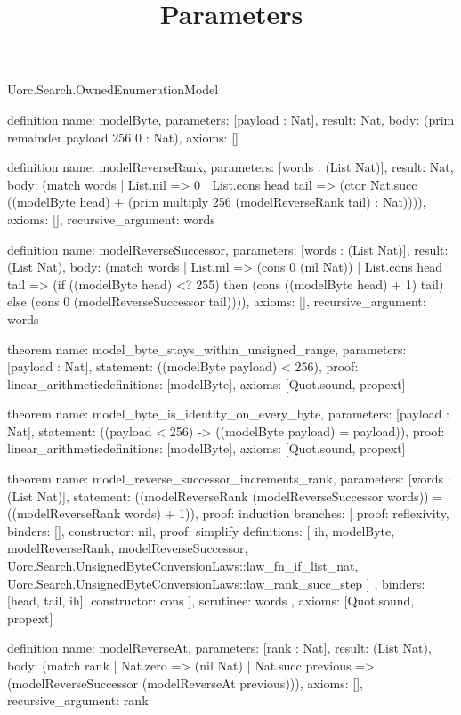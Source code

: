\begin{lexlean}{Uorc.Search.OwnedEnumerationModel}
\title{Parameters}
\begin{semanticmodule}
definition{
  name: modelByte,
  parameters: [payload : Nat],
  result: Nat,
  body: (prim remainder payload 256 0 : Nat),
  axioms: []
}

definition{
  name: modelReverseRank,
  parameters: [words : (List Nat)],
  result: Nat,
  body: (match words
    | List.nil => 0
    | List.cons head tail => (ctor Nat.succ ((modelByte head) + (prim multiply 256 (modelReverseRank tail) : Nat)))),
  axioms: [],
  recursive_argument: words
}

definition{
  name: modelReverseSuccessor,
  parameters: [words : (List Nat)],
  result: (List Nat),
  body: (match words
    | List.nil => (cons 0 (nil Nat))
    | List.cons head tail => (if ((modelByte head) <? 255) then (cons ((modelByte head) + 1) tail) else (cons 0 (modelReverseSuccessor tail)))),
  axioms: [],
  recursive_argument: words
}

theorem{
  name: model_byte_stays_within_unsigned_range,
  parameters: [payload : Nat],
  statement: ((modelByte payload) < 256),
  proof: linear_arithmetic{definitions: [modelByte]},
  axioms: [Quot.sound, propext]
}

theorem{
  name: model_byte_is_identity_on_every_byte,
  parameters: [payload : Nat],
  statement: ((payload < 256) -> ((modelByte payload) = payload)),
  proof: linear_arithmetic{definitions: [modelByte]},
  axioms: [Quot.sound, propext]
}

theorem{
  name: model_reverse_successor_increments_rank,
  parameters: [words : (List Nat)],
  statement: ((modelReverseRank (modelReverseSuccessor words)) = ((modelReverseRank words) + 1)),
  proof: induction{
    branches: [
      {proof: reflexivity{}, binders: [], constructor: nil},
      {
        proof: simplify{
          definitions: [
            ih,
            modelByte,
            modelReverseRank,
            modelReverseSuccessor,
            Uorc.Search.UnsignedByteConversionLaws::law_fn_if_list_nat,
            Uorc.Search.UnsignedByteConversionLaws::law_rank_succ_step
          ]
        },
        binders: [head, tail, ih],
        constructor: cons
      }
    ],
    scrutinee: words
  },
  axioms: [Quot.sound, propext]
}

definition{
  name: modelReverseAt,
  parameters: [rank : Nat],
  result: (List Nat),
  body: (match rank
    | Nat.zero => (nil Nat)
    | Nat.succ previous => (modelReverseSuccessor (modelReverseAt previous))),
  axioms: [],
  recursive_argument: rank
}


\end{semanticmodule}
\end{lexlean}
